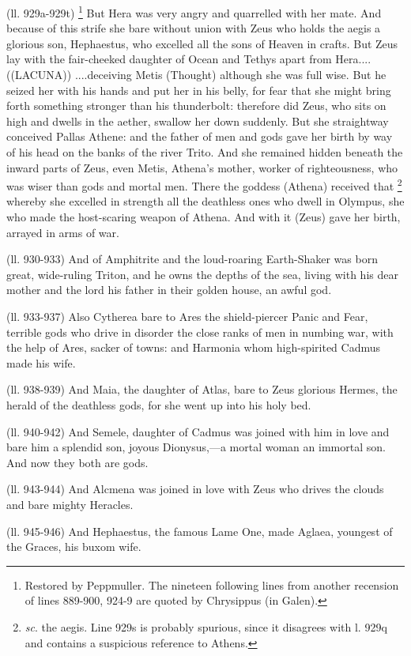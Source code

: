 (ll. 929a-929t) \footnote{Restored by Peppmuller.
The nineteen following lines from another recension of lines 889-900, 924-9 are
quoted by Chrysippus (in Galen).} But Hera was very angry and
quarrelled with her mate. And because of this strife she bare without union
with Zeus who holds the aegis a glorious son, Hephaestus, who excelled all the
sons of Heaven in crafts. But Zeus lay with the fair-cheeked daughter of Ocean
and Tethys apart from Hera.... ((LACUNA)) ....deceiving Metis (Thought)
although she was full wise. But he seized her with his hands and put her in his
belly, for fear that she might bring forth something stronger than his
thunderbolt: therefore did Zeus, who sits on high and dwells in the aether,
swallow her down suddenly. But she straightway conceived Pallas Athene: and the
father of men and gods gave her birth by way of his head on the banks of the
river Trito. And she remained hidden beneath the inward parts of Zeus, even
Metis, Athena’s mother, worker of righteousness, who was wiser than gods
and mortal men. There the goddess (Athena) received that \footnote{\emph{sc}. the aegis. Line
929s is probably spurious, since it disagrees with l. 929q and contains a
suspicious reference to Athens.} whereby she excelled in strength
all the deathless ones who dwell in Olympus, she who made the host-scaring
weapon of Athena. And with it (Zeus) gave her birth, arrayed in arms of war.

(ll. 930-933) And of Amphitrite and the loud-roaring Earth-Shaker was born
great, wide-ruling Triton, and he owns the depths of the sea, living with his
dear mother and the lord his father in their golden house, an awful god.

(ll. 933-937) Also Cytherea bare to Ares the shield-piercer Panic and Fear,
terrible gods who drive in disorder the close ranks of men in numbing war, with
the help of Ares, sacker of towns: and Harmonia whom high-spirited Cadmus made
his wife.

(ll. 938-939) And Maia, the daughter of Atlas, bare to Zeus glorious Hermes,
the herald of the deathless gods, for she went up into his holy bed.

(ll. 940-942) And Semele, daughter of Cadmus was joined with him in love and
bare him a splendid son, joyous Dionysus,—a mortal woman an immortal son.
And now they both are gods.

(ll. 943-944) And Alcmena was joined in love with Zeus who drives the clouds
and bare mighty Heracles.

(ll. 945-946) And Hephaestus, the famous Lame One, made Aglaea, youngest of the
Graces, his buxom wife.

